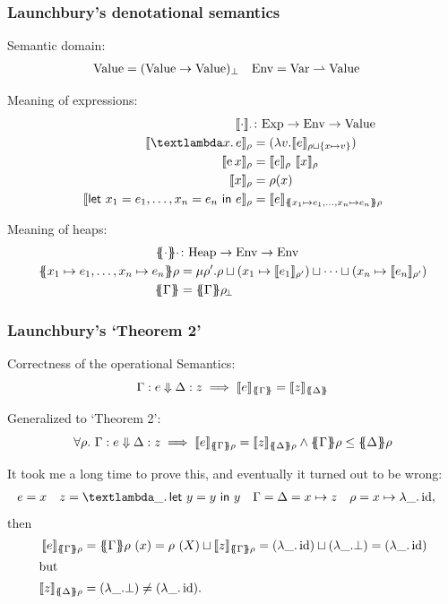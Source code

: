 \documentclass{beamer}
\newcommand\pfun{\rightharpoonup}
\begin{document}
\newcommand{\dsem}[2]{\llbracket #1 \rrbracket_{#2}}
\newcommand{\esem}[1]{\{\!\!\{#1\}\!\!\}}
\newcommand{\rhobot}{\rho\!_\bot}

\begin{frame}
\frametitle{Launchbury’s denotational semantics}

Semantic domain:
\begin{align*}
\sValue &= (\sValue \to \sValue)_\bot &
\sEnv &= \sVar \pfun \sValue
\end{align*}

Meaning of expressions:
\begin{align*}
\dsem{\cdot}{\cdot} &\colon \sExp \to \sEnv \to \sValue \\
\dsem{\sLam xe}{\rho} &=
	(\lambda v. \dsem{e}{\rho \sqcup \{x \mapsto v\}})\\
\dsem{\sApp e x}\rho &= \dsem e\rho\
	\dsem x \rho \\
\dsem{x}\rho &= \rho (x)\\
\dsem{\sLet{x_1 = e_1,\ldots, x_n = e_n}e}\rho &= \dsem{e}{\esem{ x_1\mapsto e_1,\ldots,x_n\mapsto e_n}\rho}
\end{align*}

Meaning of heaps:
\begin{align*}
\esem{\cdot}\cdot &\colon \sHeap \to \sEnv \to \sEnv \\
\esem{ x_1\mapsto e_1,\ldots,x_n\mapsto e_n}\rho
&= \mu \rho'. \rho \sqcup (x_1 \mapsto \dsem{e_1}{\rho'}) \sqcup \cdots \sqcup (x_n \mapsto \dsem{e_n}{\rho'})\\
\esem{\Gamma} &= \esem{\Gamma}\rhobot
\end{align*}
\end{frame}

\begin{frame}
\frametitle{Launchbury’s ‘Theorem 2’}

Correctness of the operational Semantics:
\[
\sred \Gamma  e \Delta z \implies \dsem{e}{\esem{\Gamma}} = \dsem{z}{\esem{\Delta}}
\]

Generalized to ‘Theorem 2’:
\[
\forall \rho.\ \sred \Gamma  e \Delta z \implies \dsem{e}{\esem{\Gamma}\rho} = \dsem{z}{\esem{\Delta}\rho} \wedge {\esem{\Gamma}\rho} \le \esem{\Delta}\rho
\]

It took me a long time to prove this, \pause and eventually it turned out to be wrong:
\begin{align*}
e &= x & z &= \sLam \_ {\sLet {y = y}y} &  \Gamma = \Delta &= x \mapsto z  & \rho &= x \mapsto \lambda \_.\operatorname{id},
\end{align*}
then
\begin{align*}
\dsem{e}{\esem{\Gamma}\rho} &= \esem{\Gamma}\rho\ (x) = \rho\ (X) \sqcup \dsem{z}{\esem{\Gamma}\rho} = (\lambda \_.\operatorname{id}) \sqcup (\lambda \_.\bot ) =  (\lambda \_.\operatorname{id})\\
\intertext{but}
\dsem{z}{\esem{\Delta}\rho} &= (\lambda \_.\bot ) \ne (\lambda \_.\operatorname{id}).
\end{align*}
\end{frame}
\end{document}
